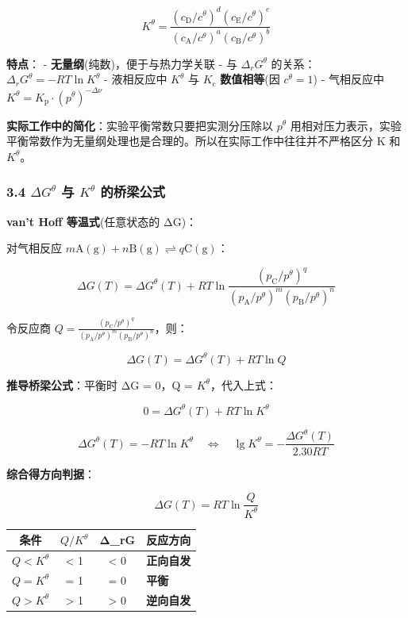 \[
K^\theta = \frac{(c_\mathrm{D}/c^\theta)^d(c_\mathrm{E}/c^\theta)^e}{(c_\mathrm{A}/c^\theta)^a(c_\mathrm{B}/c^\theta)^b}
\]

\textbf{特点}：
- \textbf{无量纲}(纯数)，便于与热力学关联
- 与 \(\Delta_r G^\theta\) 的关系：\(\Delta_r G^\theta = -RT\ln K^\theta\)
- 液相反应中 \(K^\theta\) 与 \(K_{\mathrm c}\) \textbf{数值相等}(因 \(c^\theta = 1\))
- 气相反应中 \(K^\theta = K_{\mathrm p} \cdot (p^\theta)^{-\Delta\nu}\)

\textbf{实际工作中的简化}：实验平衡常数只要把实测分压除以 \(p^\theta\) 用相对压力表示，实验平衡常数作为无量纲处理也是合理的。所以在实际工作中往往并不严格区分 K 和 \(K^\theta\)。

\subsubsection{\texorpdfstring{3.4 \(\Delta G^\theta\) 与 \(K^\theta\) 的桥梁公式}{3.4 \textbackslash Delta G\^{}\textbackslash theta 与 K\^{}\textbackslash theta 的桥梁公式}}\label{delta-gtheta-ux4e0e-ktheta-ux7684ux6865ux6881ux516cux5f0f}

\textbf{van't Hoff 等温式}(任意状态的 ΔG)：

对气相反应 \(m\mathrm{A(g)} + n\mathrm{B(g)} \rightleftharpoons q\mathrm{C(g)}\)：

\[
\Delta G(T) = \Delta G^\theta(T) + RT\ln\frac{(p_\mathrm{C}/p^\theta)^q}{(p_\mathrm{A}/p^\theta)^m(p_\mathrm{B}/p^\theta)^n}
\]

令反应商 \(Q = \frac{(p_\mathrm{C}/p^\theta)^q}{(p_\mathrm{A}/p^\theta)^m(p_\mathrm{B}/p^\theta)^n}\)，则：

\[
\boxed{\Delta G(T) = \Delta G^\theta(T) + RT\ln Q}
\]

\textbf{推导桥梁公式}：平衡时 ΔG = 0，Q = \(K^\theta\)，代入上式：

\[
0 = \Delta G^\theta(T) + RT\ln K^\theta
\]

\[
\boxed{\Delta G^\theta(T) = -RT\ln K^\theta \quad \Longleftrightarrow \quad \lg K^\theta = -\frac{\Delta G^\theta(T)}{2.30RT}}
\]

\textbf{综合得方向判据}：

\[
\Delta G(T) = RT\ln\frac{Q}{K^\theta}
\]

{\def\LTcaptype{none} %
\begin{longtable}[]{@{}cccl@{}}
\toprule\noalign{}
条件 & \(Q/K^\theta\) & Δ\_rG & 反应方向 \\
\midrule\noalign{}
\endhead
\bottomrule\noalign{}
\endlastfoot
\(Q < K^\theta\) & \textless{} 1 & \textless{} 0 & \textbf{正向自发} \\
\(Q = K^\theta\) & = 1 & = 0 & \textbf{平衡} \\
\(Q > K^\theta\) & \textgreater{} 1 & \textgreater{} 0 & \textbf{逆向自发} \\
\end{longtable}
}

